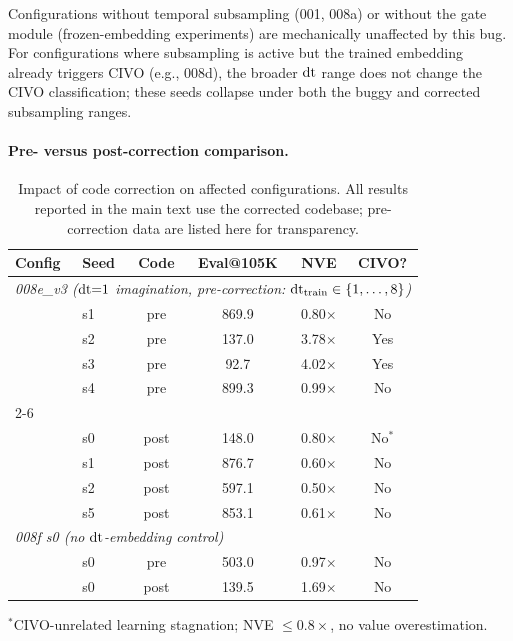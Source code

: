 Configurations without temporal subsampling (001, 008a) or without the gate module (frozen-embedding experiments) are mechanically unaffected by this bug. For configurations where subsampling is active but the trained embedding already triggers CIVO (e.g., 008d), the broader $\mathrm{dt}$ range does not change the CIVO classification; these seeds collapse under both the buggy and corrected subsampling ranges.

\paragraph{Pre- versus post-correction comparison.}

\begin{table}[h]
\centering
\caption{Impact of code correction on affected configurations. All results reported in the main text use the corrected codebase; pre-correction data are listed here for transparency.}
\label{tab:code_correction}
\footnotesize
\begin{tabular}{llcccc}
\toprule
\textbf{Config} & \textbf{Seed} & \textbf{Code} & \textbf{Eval@105K} & \textbf{NVE} & \textbf{CIVO?} \\
\midrule
\multicolumn{6}{l}{\textit{008e\_v3 ($\dt{=}1$ imagination, pre-correction: $\mathrm{dt}_{\mathrm{train}} \in \{1,\ldots,8\}$)}} \\
& s1 & pre & 869.9 & 0.80$\times$ & No \\
& s2 & pre & 137.0 & 3.78$\times$ & Yes \\
& s3 & pre & 92.7 & 4.02$\times$ & Yes \\
& s4 & pre & 899.3 & 0.99$\times$ & No \\
\cmidrule{2-6}
\multicolumn{6}{l}{\textit{008e\_v3 ($\dt{=}1$ imagination, post-correction: $\dt_{\mathrm{train}} \in \{1,2\}$)}} \\
& s0 & post & 148.0 & 0.80$\times$ & No$^*$ \\
& s1 & post & 876.7 & 0.60$\times$ & No \\
& s2 & post & 597.1 & 0.50$\times$ & No \\
& s5 & post & 853.1 & 0.61$\times$ & No \\
\midrule
\multicolumn{6}{l}{\textit{008f s0 (no $\mathrm{dt}$-embedding control)}} \\
& s0 & pre & 503.0 & 0.97$\times$ & No \\
& s0 & post & 139.5 & 1.69$\times$ & No \\
\bottomrule
\end{tabular}
\vspace{1pt}
{\raggedright\footnotesize $^*$CIVO-unrelated learning stagnation; NVE $\leq 0.8\times$, no value overestimation.\par}
\end{table}

